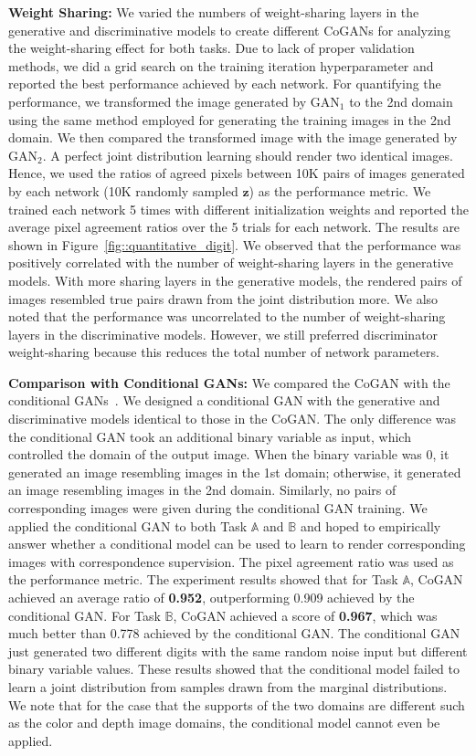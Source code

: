 {\bf Weight Sharing:} We varied the numbers of weight-sharing layers in the generative and discriminative models to create different CoGANs for analyzing the weight-sharing effect for both tasks. Due to lack of proper validation methods, we did a grid search on the training iteration hyperparameter and reported the best performance achieved by each network. For quantifying the performance, we transformed the image generated by $\text{GAN}_1$ to the 2nd domain using the same method employed for generating the training images in the 2nd domain. We then compared the transformed image with the image generated by $\text{GAN}_2$. A perfect joint distribution learning should render two identical images. Hence, we used the ratios of agreed pixels between 10K pairs of images generated by each network (10K randomly sampled $\mathbf{z}$) as the performance metric. We trained each network 5 times with different initialization weights and reported the average pixel agreement ratios over the 5 trials for each network. The results are shown in Figure~\ref{fig::quantitative_digit}. We observed that the performance was positively correlated with the number of weight-sharing layers in the generative models. With more sharing layers in the generative models, the rendered pairs of images resembled true pairs drawn from the joint distribution more. We also noted that the performance was uncorrelated to the number of weight-sharing layers in the discriminative models. However, we still preferred discriminator weight-sharing because this reduces the total number of network parameters.

{\bf Comparison with Conditional GANs:} We compared the CoGAN with the conditional GANs~\cite{mirza2014conditional}. We designed a conditional GAN with the generative and discriminative models identical to those in the CoGAN. The only difference was the conditional GAN took an additional binary variable as input, which controlled the domain of the output image. When the binary variable was 0, it generated an image resembling images in the 1st domain; otherwise, it generated an image resembling images in the 2nd domain. Similarly, no pairs of corresponding images were given during the conditional GAN training. We applied the conditional GAN to both Task  $\mathbb{A}$ and $\mathbb{B}$ and hoped to empirically answer whether a conditional model can be used to learn to render corresponding images with correspondence supervision. The pixel agreement ratio was used as the performance metric. The experiment results showed that for Task $\mathbb{A}$, CoGAN achieved an average ratio of {\bf 0.952}, outperforming 0.909 achieved by the conditional GAN. For Task $\mathbb{B}$, CoGAN achieved a score of {\bf 0.967}, which was much better than 0.778 achieved by the conditional GAN. The conditional GAN just generated two different digits with the same random noise input but different binary variable values. These results showed that the conditional model failed to learn a joint distribution from samples drawn from the marginal distributions. We note that for the case that the supports of the two domains are different such as the color and depth image domains, the conditional model cannot even be applied. 

